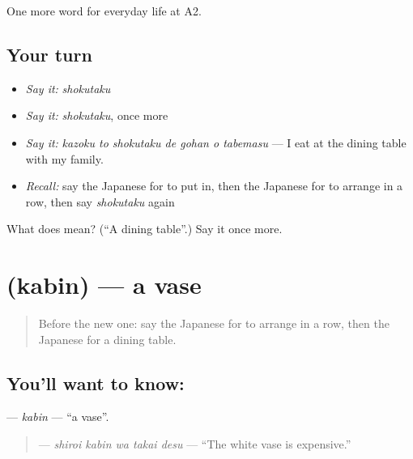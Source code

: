 \begin{grammarlens}[title={What you've built}]
One more word for everyday life at A2.
\end{grammarlens}

\subsection*{Your turn}
\begin{itemize}
\raggedright
  \item \emph{Say it:} \emph{shokutaku}
  \item \emph{Say it:} \emph{shokutaku}, once more
  \item \emph{Say it:} \emph{kazoku to shokutaku de gohan o tabemasu} — I eat at the dining table with my family.
  \item \emph{Recall:} say the Japanese for to put in, then the Japanese for to arrange in a row, then say \emph{shokutaku} again
\end{itemize}

\begin{tcolorbox}[breakable,colback=teal!4,colframe=teal!35!black,title={Before you move on}]
What does  mean? (\textquotedblleft{}A dining table\textquotedblright{}.) Say it once more.
\end{tcolorbox}
\section[\texorpdfstring{\ja{かびん} (kabin)}{かびん (kabin)}]{ (kabin) — a vase}

\label{lesson:JA-C157-kabin}



\begin{quote}
Before the new one: say the Japanese for to arrange in a row, then the Japanese for a dining table.
\end{quote}

\subsection*{You'll want to know: }
\textbf{} — \emph{kabin} — \textquotedblleft{}a vase\textquotedblright{}.

\begin{quote}
\textbf{  } — \emph{shiroi kabin wa takai desu} — \textquotedblleft{}The white vase is expensive.\textquotedblright{}
\end{quote}

